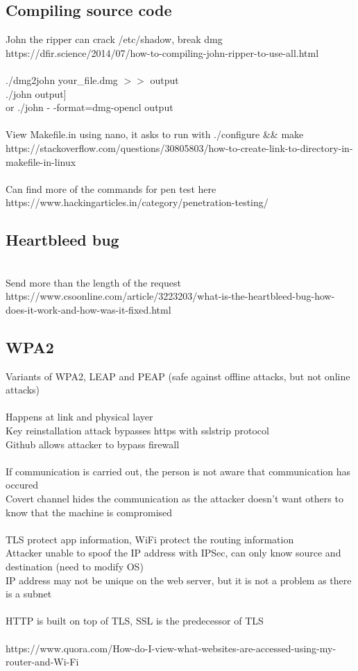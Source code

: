 \documentclass[11pt]{article}
\begin{document}
\begin{multicols*}{3}
\subsection*{Compiling source code}
John the ripper can crack /etc/shadow, break dmg\\
\textcolor{link}{https://dfir.science/2014/07/how-to-compiling-john-ripper-to-use-all.html}\\
\\./dmg2john your\_file.dmg $>>$ output
\\./john output]\\
or ./john - -format=dmg-opencl output\\
\\
View Makefile.in using nano, it asks to run with ./configure && make\\
\textcolor{link}{https://stackoverflow.com/questions/30805803/how-to-create-link-to-directory-in-makefile-in-linux}\\
\\
Can find more of the commands for pen test here\\
\textcolor{link}{https://www.hackingarticles.in/category/penetration-testing/}
\subsection*{Heartbleed bug}\\
Send more than the length of the request
\textcolor{link}{https://www.csoonline.com/article/3223203/what-is-the-heartbleed-bug-how-does-it-work-and-how-was-it-fixed.html}
\subsection*{WPA2}
Variants of WPA2, LEAP and PEAP (safe against offline attacks, but not online attacks)\\\\
Happens at link and physical layer\\
Key reinstallation attack bypasses https with sslstrip protocol\\
Github allows attacker to bypass firewall\\\\
If communication is carried out, the person is not aware that communication has occured\\
Covert channel hides the communication as the attacker doesn't want others to know that the machine is compromised
\\\\
TLS protect app information, WiFi protect the routing information\\
Attacker unable to spoof the IP address with IPSec, can only know source and destination (need to modify OS)\\
IP address may not be unique on the web server, but it is not a problem as there is a subnet\\\\
HTTP is built on top of TLS, SSL is the predecessor of TLS\\\\
\textcolor{link}{https://www.quora.com/How-do-I-view-what-websites-are-accessed-using-my-router-and-Wi-Fi}

\end{multicols*}
\end{document}
